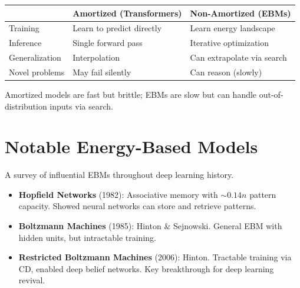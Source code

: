 \begin{remark}\leavevmode
    \begin{center}
    \begin{tabular}{lll}
        \hline
        & \textbf{Amortized (Transformers)} & \textbf{Non-Amortized (EBMs)} \\
        \hline
        Training & Learn to predict directly & Learn energy landscape \\
        Inference & Single forward pass & Iterative optimization \\
        Generalization & Interpolation & Can extrapolate via search \\
        Novel problems & May fail silently & Can reason (slowly) \\
        \hline
    \end{tabular}
    \end{center}
    Amortized models are fast but brittle; EBMs are slow but can handle out-of-distribution inputs via search.
\end{remark}

\section{Notable Energy-Based Models}

A survey of influential EBMs throughout deep learning history.

\begin{remark}\leavevmode
    \begin{itemize}
        \item \textbf{Hopfield Networks} (1982): Associative memory with $\sim 0.14n$ pattern capacity. Showed neural networks can store and retrieve patterns.

        \item \textbf{Boltzmann Machines} (1985): Hinton \& Sejnowski. General EBM with hidden units, but intractable training.

        \item \textbf{Restricted Boltzmann Machines} (2006): Hinton. Tractable training via CD, enabled deep belief networks. Key breakthrough for deep learning revival.
    \end{itemize}
\end{remark}

